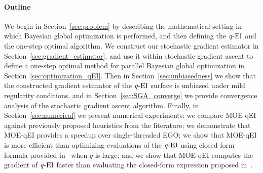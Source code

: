 \documentclass[paper=letter]{scrartcl}
\newcommand{\qEI}{\text{\textit q-EI}}
\begin{document}


\paragraph{Outline}
We begin in Section~\ref{sec:problem} by describing the mathematical setting 
in which Bayesian global optimization is performed, and then defining the $\qEI$ and the 
one-step optimal algorithm.  
We construct our stochastic gradient estimator in Section~\ref{sec:gradient_estimator}, 
and use it within stochastic gradient ascent to define a one-step optimal method 
for parallel Bayesian global optimization in Section~\ref{sec:optimization_qEI}.
Then in Section~\ref{sec:unbiasedness} we show that the constructed gradient estimator of the $\qEI$ surface 
is unbiased under mild regularity conditions, and in Section~\ref{sec:SGA_converge} we provide 
convergence analysis of the stochastic gradient ascent algorithm.
Finally, in Section~\ref{sec:numerical} we present numerical experiments: 
we compare MOE-qEI against previously proposed 
heuristics from the literature; we demonstrate that MOE-qEI provides a speedup 
over single-threaded EGO; we show that MOE-qEI is more efficient than 
optimizing evaluations of the $\qEI$ using closed-form formula provided in~\cite{chevalier2013fast} when $q$ is large;
and we show that MOE-qEI computes the gradient of $\qEI$ faster than evaluating the closed-form expression
proposed in~\cite{marmin2015differentiating}.
 


\end{document}
